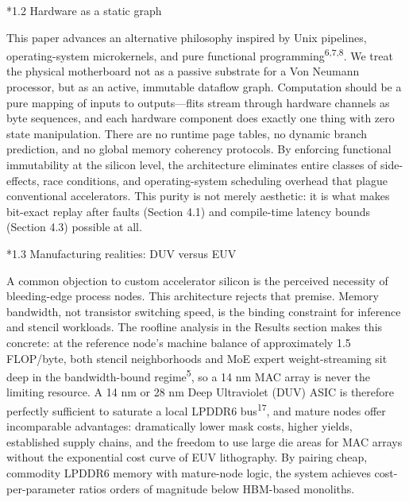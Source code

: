 \documentclass[12pt]{article}
\makeatletter
\renewcommand\subsection{\@startsection{subsection}{2}{\z@}{-1.0ex \@plus -0.2ex}{0.3ex}{\normalsize\bfseries}}
\makeatother
\begin{document}
\subsection*{1.2 Hardware as a static graph}

This paper advances an alternative philosophy inspired by Unix pipelines, operating-system microkernels, and pure functional programming\textsuperscript{6,7,8}. We treat the physical motherboard not as a passive substrate for a Von Neumann processor, but as an active, immutable dataflow graph. Computation should be a pure mapping of inputs to outputs---flits stream through hardware channels as byte sequences, and each hardware component does exactly one thing with zero state manipulation. There are no runtime page tables, no dynamic branch prediction, and no global memory coherency protocols. By enforcing functional immutability at the silicon level, the architecture eliminates entire classes of side-effects, race conditions, and operating-system scheduling overhead that plague conventional accelerators. This purity is not merely aesthetic: it is what makes bit-exact replay after faults (Section 4.1) and compile-time latency bounds (Section 4.3) possible at all.

\subsection*{1.3 Manufacturing realities: DUV versus EUV}

A common objection to custom accelerator silicon is the perceived necessity of bleeding-edge process nodes. This architecture rejects that premise. Memory bandwidth, not transistor switching speed, is the binding constraint for inference and stencil workloads. The roofline analysis in the Results section makes this concrete: at the reference node's machine balance of approximately 1.5 FLOP/byte, both stencil neighborhoods and MoE expert weight-streaming sit deep in the bandwidth-bound regime\textsuperscript{5}, so a 14 nm MAC array is never the limiting resource. A 14 nm or 28 nm Deep Ultraviolet (DUV) ASIC is therefore perfectly sufficient to saturate a local LPDDR6 bus\textsuperscript{17}, and mature nodes offer incomparable advantages: dramatically lower mask costs, higher yields, established supply chains, and the freedom to use large die areas for MAC arrays without the exponential cost curve of EUV lithography. By pairing cheap, commodity LPDDR6 memory with mature-node logic, the system achieves cost-per-parameter ratios orders of magnitude below HBM-based monoliths.
\end{document}

